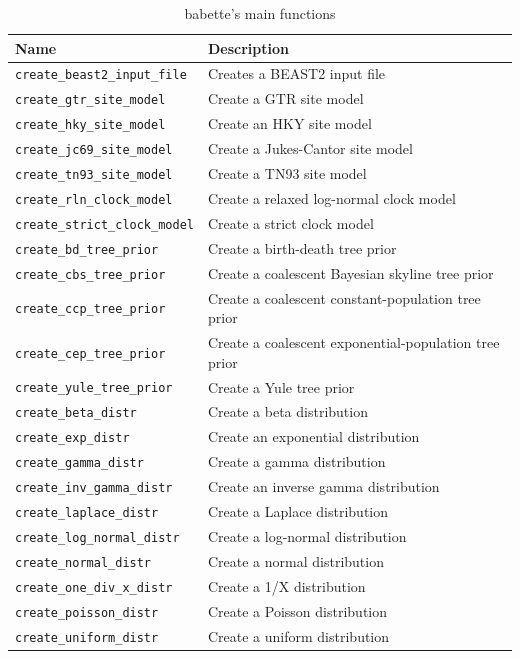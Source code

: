 \documentclass{article}
\begin{document}
\begin{table}[]
\centering
\begin{tabular}{ | l | l | }
\hline
\textbf{Name} & \textbf{Description} \\
\hline
\verb;create_beast2_input_file; & Creates a BEAST2 input file \\
\hline
\verb;create_gtr_site_model; & Create a GTR site model \\
\verb;create_hky_site_model; & Create an HKY site model \\
\verb;create_jc69_site_model; & Create a Jukes-Cantor site model \\
\verb;create_tn93_site_model; & Create a TN93 site model \\
\hline
\verb;create_rln_clock_model; & Create a relaxed log-normal clock model \\
\verb;create_strict_clock_model; & Create a strict clock model \\
\hline
\verb;create_bd_tree_prior; & Create a birth-death tree prior \\
\verb;create_cbs_tree_prior; & Create a coalescent Bayesian skyline tree prior \\
\verb;create_ccp_tree_prior; & Create a coalescent constant-population tree prior \\
\verb;create_cep_tree_prior; & Create a coalescent exponential-population tree prior \\
\verb;create_yule_tree_prior; & Create a Yule tree prior \\
\hline
\verb;create_beta_distr; & Create a beta distribution \\
\verb;create_exp_distr; & Create an exponential distribution \\
\verb;create_gamma_distr; & Create a gamma distribution \\
\verb;create_inv_gamma_distr; & Create an inverse gamma distribution \\
\verb;create_laplace_distr; & Create a Laplace distribution \\
\verb;create_log_normal_distr; & Create a log-normal distribution \\
\verb;create_normal_distr; & Create a normal distribution \\
\verb;create_one_div_x_distr; & Create a 1/X distribution \\
\verb;create_poisson_distr; & Create a Poisson distribution \\
\verb;create_uniform_distr; & Create a uniform distribution \\
\hline
\end{tabular}
\caption{babette's main functions}
\label{tab:functions}
\end{table}
\end{document}
